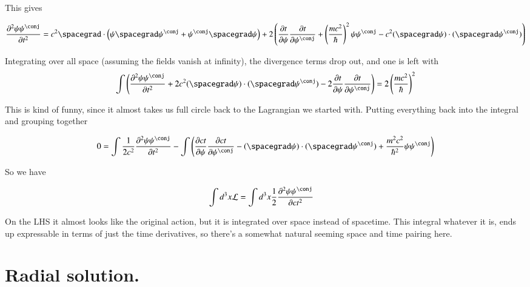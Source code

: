 \documentclass{article}
\newcommand{\PDSq}[2]{\frac{\partial^2 {#2}}{\partial {#1}^2}}
\begin{document}
This gives

\begin{align*}
\PDSq{t}{\psi\psi^\conj} 
&= 
c^2 \spacegrad \cdot \left( \psi \spacegrad \psi^\conj +\psi^\conj \spacegrad \psi \right)
+ 2 \left( 
\PD{t}{\psi}\PD{t}{\psi^\conj} + \left( \frac{m c^2}{\hbar} \right)^2 \psi \psi^\conj 
-c^2 (\spacegrad \psi) \cdot (\spacegrad \psi^\conj) 
\right)
\\
\end{align*}

Integrating over all space (assuming the fields vanish at infinity), the divergence terms drop out, and one is left with
\begin{align*}
\int \left( \PDSq{t}{\psi\psi^\conj} 
+ 2 c^2 (\spacegrad \psi) \cdot (\spacegrad \psi^\conj) 
- 2 \PD{t}{\psi}\PD{t}{\psi^\conj}  \right) 
&= 
2 \left( \frac{m c^2}{\hbar} \right)^2 
\\
\end{align*}

This is kind of funny, since it almost takes us full circle back to the Lagrangian we started with.  Putting everything 
back into the integral and grouping together 

\begin{align*}
0 &=
\int \inv{2 c^2} \PDSq{t}{\psi\psi^\conj} 
- \int 
\left(
\PD{ct}{\psi}\PD{ct}{\psi^\conj}  
- (\spacegrad \psi) \cdot (\spacegrad \psi^\conj) 
+ \frac{m^2 c^2}{\hbar^2} \psi \psi^\conj
\right)
\\
\end{align*}

So we have

\begin{align*}
\int d^3 x \LL &= \int d^3 x \inv{2} \PDSq{ct}{\psi\psi^\conj} 
\end{align*}

On the LHS it almost looks like the original action, but it is integrated over space instead of spacetime.  This integral 
whatever it is, ends up expressable in terms of just the time derivatives, so there's a somewhat natural seeming space and time
pairing here.

\section{ Radial solution. }
\end{document}

